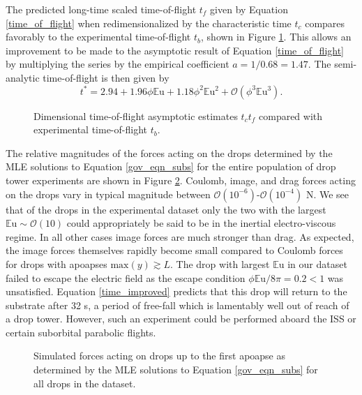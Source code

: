 \documentclass[aip,reprint, floatfix]{revtex4-1}
\begin{document}
The predicted long-time scaled time-of-flight $t_f$ given by Equation \ref{time_of_flight} when redimensionalized by the characteristic time $t_c$ compares favorably to the experimental time-of-flight $t_b$, shown in Figure \ref{fig:times2}. This allows an improvement to be made to the asymptotic result of Equation \ref{time_of_flight} by multiplying the series by the empirical coefficient $a = 1/0.68 = 1.47$. The semi-analytic time-of-flight is then given by
\begin{equation}
\label{time_improved}
t^* = 2.94 + 1.96\phi\mathbb{E}\mbox{u} + 1.18\phi^2\mathbb{E}\mbox{u}^{2} + \mathcal{O}(\phi^3\mathbb{E}\mbox{u}^{3}).
\end{equation}
\begin{figure}[htb]
    \centering
    \resizebox{0.5\textwidth}{!}{}
    \caption{Dimensional time-of-flight asymptotic estimates $t_c t_f$ compared with experimental time-of-flight $t_b$.\label{fig:times2}}
\end{figure}
The relative magnitudes of the forces acting on the drops determined by the MLE solutions to Equation \ref{gov_eqn_subs} for the entire population of drop tower experiments are shown in Figure \ref{fig:forces}. Coulomb, image, and drag forces acting on the drops vary in typical magnitude between $\mathcal{O}(10^{-6})$-$\mathcal{O}(10^{-4})$ N. We see that of the drops in the experimental dataset only the two with the largest $\mathbb{E}\mbox{u} \sim \mathcal{O}(10)$ could appropriately be said to be in the inertial electro-viscous regime. In all other cases image forces are much stronger than drag. As expected, the image forces themselves rapidly become small compared to Coulomb forces for drops with apoapses $\mbox{max}\left( y\right) \gtrsim L$. The drop with largest $\mathbb{E}\mbox{u}$ in our dataset failed to escape the electric field as the escape condition $\phi \mathbb{E}\mbox{u} / 8\pi = 0.2 < 1$ was unsatisfied. Equation \ref{time_improved} predicts that this drop will return to the substrate after 32 s, a period of free-fall which is lamentably well out of reach of a drop tower. However, such an experiment could be performed aboard the ISS or certain suborbital parabolic flights.
\begin{figure}[!htb]
    \centering
    \resizebox{0.5\textwidth}{!}{}
    \caption{Simulated forces acting on drops up to the first apoapse as determined by the MLE solutions to Equation \ref{gov_eqn_subs} for all drops in the dataset.\label{fig:forces}}
\end{figure}
\end{document}
